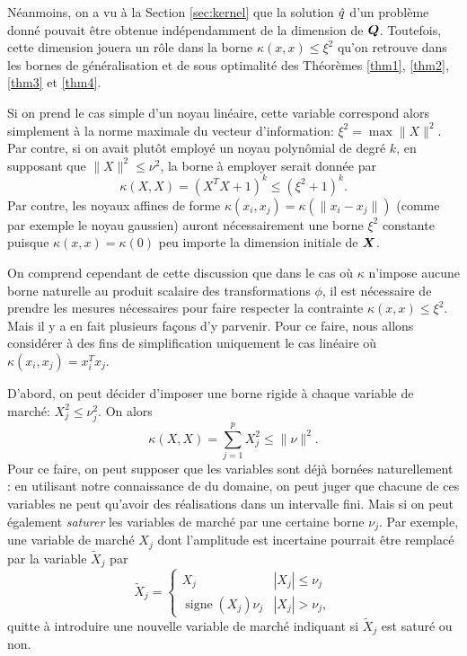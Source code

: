 Néanmoins, on a vu à la Section \ref{sec:kernel} que la solution $\hat q$ d'un problème donné
pouvait être obtenue indépendamment de la dimension de $\bm Q$. Toutefois, cette dimension
jouera un rôle dans la borne $\kappa(x,x) \leq \xi^2$ qu'on retrouve dans les bornes de
généralisation et de sous optimalité des Théorèmes \ref{thm1}, \ref{thm2}, \ref{thm3} et
\ref{thm4}.

Si on prend le cas simple d'un noyau linéaire, cette variable correspond alors simplement
à la norme maximale du vecteur d'information: $\xi^2 = \max\|X\|^2$.  Par contre, si on
avait plutôt employé un noyau polynômial de degré $k$, en supposant que $\|X\|^2 \leq \nu^2$, la
borne à employer serait donnée par
\begin{equation}
\kappa(X,X) = (X^TX + 1)^k \leq (\xi^2 + 1)^k.
\end{equation}
Par contre, les noyaux affines de forme $\kappa(x_i,x_j) = \kappa(\|x_i - x_j\|)$ (comme par exemple
le noyau gaussien) auront nécessairement une borne $\xi^2$ constante puisque
$\kappa(x,x) = \kappa(0)$ peu importe la dimension initiale de $\bm{X}$.

On comprend cependant de cette discussion que dans le cas où $\kappa$ n'impose aucune borne
naturelle au produit scalaire des transformations $\phi$, il est nécessaire de prendre les
mesures nécessaires pour faire respecter la contrainte $\kappa(x,x)\leq\xi^2$. Mais il y a en fait
plusieurs façons d'y parvenir. Pour ce faire, nous allons considérer à
des fins de simplification uniquement le cas linéaire où $\kappa(x_i,x_j) = x_i^Tx_j$.

D'abord, on peut décider d'imposer une borne rigide à chaque variable de marché: $X_j^2 \leq
\nu_j^2$. On alors 
\begin{equation}
  \kappa(X,X) = \sum_{j=1}^p X_j^2 \leq \|\nu\|^2.
\end{equation}
Pour ce faire, on peut supposer que les variables sont déjà bornées naturellement : en
utilisant notre connaissance de du domaine, on peut juger que chacune de ces variables ne
peut qu'avoir des réalisations dans un intervalle fini. Mais si on peut également
\textit{saturer} les variables de marché par une certaine borne $\nu_j$. Par exemple, une
variable de marché $X_j$ dont l'amplitude est incertaine pourrait être remplacé par la
variable $\tilde X_j$ par 
\begin{equation}
  \tilde X_j = \begin{cases}
    X_j & |X_j| \leq \nu_j\\
     \operatorname{signe}(X_j)\nu_j & |X_j| > \nu_j,
  \end{cases}
\end{equation}
quitte à introduire une nouvelle variable de marché indiquant si $\tilde X_j$ est saturé
ou non.

